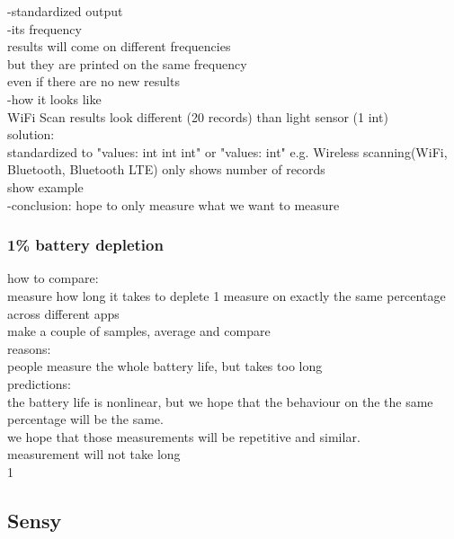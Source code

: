 					
		-standardized output\\
				-its frequency\\
					results will come on different frequencies\\
					but they are printed on the same frequency\\
						even if there are no new results\\
				-how it looks like\\
					WiFi Scan results look different (20 records) than light sensor (1 int)\\
					solution:\\
						standardized to "values: int int int" or "values: int"
							e.g. Wireless scanning(WiFi, Bluetooth, Bluetooth LTE) only shows number of records\\
							show example\\	
		-conclusion: hope to only measure what we want to measure\\				
				
\subsubsection{1\% battery depletion}				
how to compare:\\
	measure how long it takes to deplete 1%
		measure on exactly the same percentage across different apps\\
		make a couple of samples, average and compare\\
		reasons:\\
			people measure the whole battery life, but takes too long\\
			
			
		predictions:\\
			the battery life is nonlinear, but we hope that the behaviour on the the same percentage will be the same.\\
			we hope that those measurements will be repetitive and similar.\\
			measurement will not take long\\
			1%
			
			
		
		
		
\subsection{Sensy}
